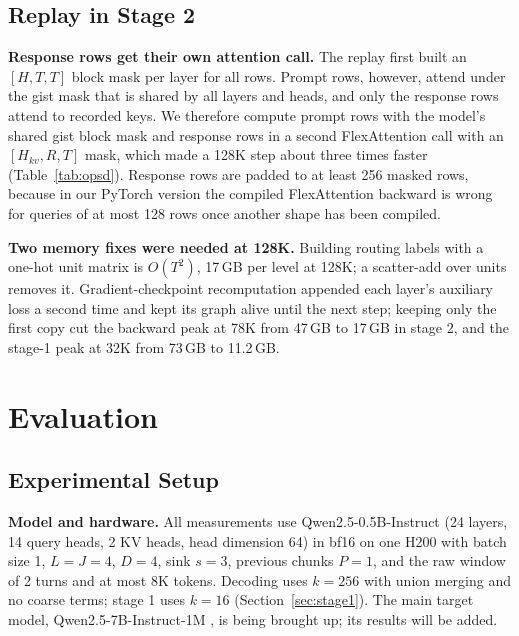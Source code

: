 \documentclass[10pt,twocolumn]{article}
\newcommand{\para}[1]{\noindent\textbf{#1}\hspace{0.5em}}
\begin{document}
\subsection{Replay in Stage 2}
\label{sec:replay}

\para{Response rows get their own attention call.}
The replay first built an $[H,T,T]$ block mask per layer for all rows. Prompt rows, however,
attend under the gist mask that is shared by all layers and heads, and only the response rows
attend to recorded keys. We therefore compute prompt rows with the model's shared gist block
mask and response rows in a second FlexAttention call with an $[H_{kv},R,T]$ mask, which made a
128K step about three times faster (Table~\ref{tab:opsd}). Response rows are padded to at least
256 masked rows, because in our PyTorch version the compiled FlexAttention backward is wrong
for queries of at most 128 rows once another shape has been compiled.

\para{Two memory fixes were needed at 128K.}
Building routing labels with a one-hot unit matrix is $O(T^2)$, 17\,GB per level at 128K; a
scatter-add over units removes it. Gradient-checkpoint recomputation appended each layer's
auxiliary loss a second time and kept its graph alive until the next step; keeping only the
first copy cut the backward peak at 78K from 47\,GB to 17\,GB in stage 2, and the stage-1 peak
at 32K from 73\,GB to 11.2\,GB.

\section{Evaluation}
\label{sec:eval}

\subsection{Experimental Setup}

\para{Model and hardware.}
All measurements use Qwen2.5-0.5B-Instruct \citep{qwen2025qwen25} (24 layers, 14 query heads,
2 KV heads, head dimension 64) in bf16 on one H200 with batch size 1, $L=J=4$, $D=4$, sink
$s=3$, previous chunks $P=1$, and the raw window of 2 turns and at most 8K tokens. Decoding
uses $k=256$ with union merging and no coarse terms; stage 1 uses $k=16$
(Section~\ref{sec:stage1}). The main target
model, Qwen2.5-7B-Instruct-1M \citep{yang2025qwen1m}, is being brought up; its results will be
added.
\end{document}
